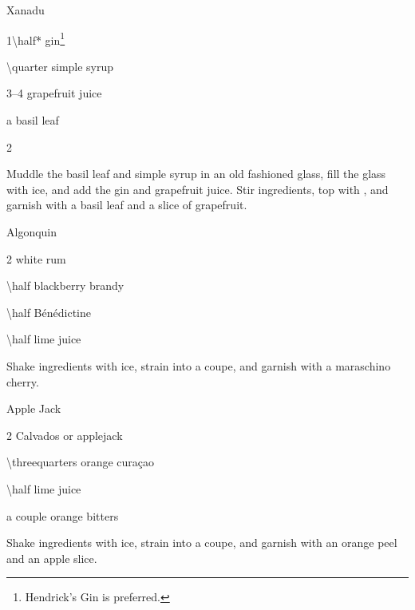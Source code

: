 \begin{Cocktail}{Xanadu}
	\begin{Ingredients}
	\item \SI{1\half*}{\oz} gin\footnote{Hendrick's Gin is preferred.}
	\item \SI{\quarter}{\oz} simple syrup
	\item \SIrange{3}{4}{\oz} grapefruit juice
	\item a basil leaf
	\item \SI{2}{\oz} \soda\/
	\end{Ingredients}
	
	\begin{Instructions}
	Muddle the basil leaf and simple syrup in an old fashioned glass, fill the glass with ice, and add the gin and grapefruit juice.  Stir ingredients, top with \soda\/, and garnish with a basil leaf and a slice of grapefruit.
	\end{Instructions}
\end{Cocktail}

\begin{Cocktail}{Algonquin}
	\begin{Ingredients}
	\item \SI{2}{\oz} white rum
	\item \SI{\half}{\oz} blackberry brandy
	\item \SI{\half}{\oz} B\'en\'edictine
	\item \SI{\half}{\oz} lime juice
	\end{Ingredients}
	
	\begin{Instructions}
	Shake ingredients with ice, strain into a coupe, and garnish with a maraschino cherry.
	\end{Instructions}
\end{Cocktail}

\begin{Cocktail}{Apple Jack}
	\begin{Ingredients}
	\item \SI{2}{\oz} Calvados or applejack
	\item \SI{\threequarters}{\oz} orange cura\c{c}ao
	\item \SI{\half}{\oz} lime juice
	\item a couple \si{\dashes} orange bitters
	\end{Ingredients}
	
	\begin{Instructions}
	Shake ingredients with ice, strain into a coupe, and garnish with an orange peel and an apple slice.
	\end{Instructions}
\end{Cocktail}

